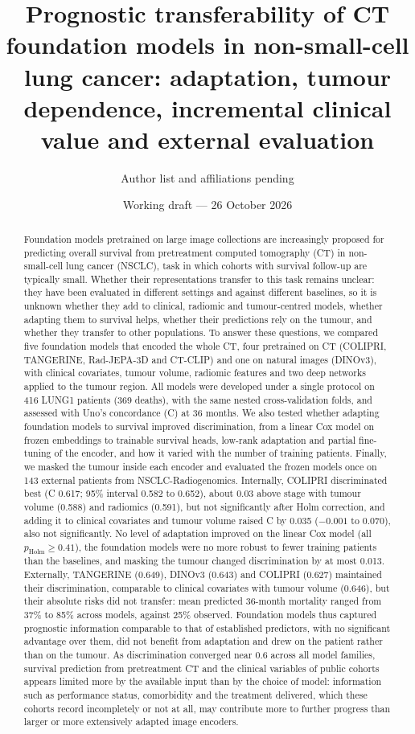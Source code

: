 \documentclass[11pt,a4paper]{article}
\title{Prognostic transferability of CT foundation models in non-small-cell lung cancer: adaptation, tumour dependence, incremental clinical value and external evaluation}
\author{Author list and affiliations pending}
\date{Working draft --- 26 October 2026}
\begin{document}
\maketitle
\begin{abstract}
Foundation models pretrained on large image collections are increasingly proposed for predicting overall survival from pretreatment computed tomography (CT) in non-small-cell lung cancer (NSCLC), task in which cohorts with survival follow-up are typically small. Whether their representations transfer to this task remains unclear: they have been evaluated in different settings and against different baselines, so it is unknown whether they add to clinical, radiomic and tumour-centred models, whether adapting them to survival helps, whether their predictions rely on the tumour, and whether they transfer to other populations. To answer these questions, we compared five foundation models that encoded the whole CT, four pretrained on CT (COLIPRI, TANGERINE, Rad-JEPA-3D and CT-CLIP) and one on natural images (DINOv3), with clinical covariates, tumour volume, radiomic features and two deep networks applied to the tumour region. All models were developed under a single protocol on 416 LUNG1 patients (369 deaths), with the same nested cross-validation folds, and assessed with Uno's concordance (C) at 36 months. We also tested whether adapting foundation models to survival improved discrimination, from a linear Cox model on frozen embeddings to trainable survival heads, low-rank adaptation and partial fine-tuning of the encoder, and how it varied with the number of training patients. Finally, we masked the tumour inside each encoder and evaluated the frozen models once on 143 external patients from NSCLC-Radiogenomics. Internally, COLIPRI discriminated best (C 0.617; 95\% interval 0.582 to 0.652), about 0.03 above stage with tumour volume (0.588) and radiomics (0.591), but not significantly after Holm correction, and adding it to clinical covariates and tumour volume raised C by 0.035 ($-0.001$ to 0.070), also not significantly. No level of adaptation improved on the linear Cox model (all $p_\mathrm{Holm}\geq0.41$), the foundation models were no more robust to fewer training patients than the baselines, and masking the tumour changed discrimination by at most 0.013. Externally, TANGERINE (0.649), DINOv3 (0.643) and COLIPRI (0.627) maintained their discrimination, comparable to clinical covariates with tumour volume (0.646), but their absolute risks did not transfer: mean predicted 36-month mortality ranged from 37\% to 85\% across models, against 25\% observed. Foundation models thus captured prognostic information comparable to that of established predictors, with no significant advantage over them, did not benefit from adaptation and drew on the patient rather than on the tumour. As discrimination converged near 0.6 across all model families, survival prediction from pretreatment CT and the clinical variables of public cohorts appears limited more by the available input than by the choice of model: information such as performance status, comorbidity and the treatment delivered, which these cohorts record incompletely or not at all, may contribute more to further progress than larger or more extensively adapted image encoders.
\end{abstract}
\end{document}
